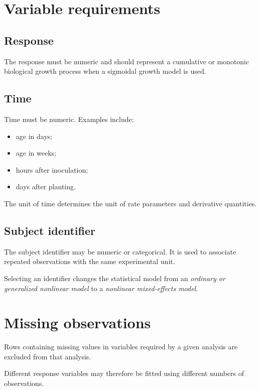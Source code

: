 \documentclass[
  english,
  letterpaper,
  DIV=11,
  numbers=noendperiod]{scrreprt}
\providecommand{\tightlist}{%
  \setlength{\itemsep}{0pt}\setlength{\parskip}{0pt}}
\begin{document}
\section{Variable requirements}\label{variable-requirements}

\subsection{Response}\label{response}

The response must be numeric and should represent a cumulative or
monotonic biological growth process when a sigmoidal growth model is
used.

\subsection{Time}\label{time}

Time must be numeric. Examples include:

\begin{itemize}
\tightlist
\item
  age in days;
\item
  age in weeks;
\item
  hours after inoculation;
\item
  days after planting.
\end{itemize}

The unit of time determines the unit of rate parameters and derivative
quantities.

\subsection{Subject identifier}\label{subject-identifier}

The subject identifier may be numeric or categorical. It is used to
associate repeated observations with the same experimental unit.

Selecting an identifier changes the statistical model from an
\emph{ordinary or generalized nonlinear model} to a \emph{nonlinear
mixed-effects model}.

\section{Missing observations}\label{missing-observations}

Rows containing missing values in variables required by a given analysis
are excluded from that analysis.

Different response variables may therefore be fitted using different
numbers of observations.
\end{document}
